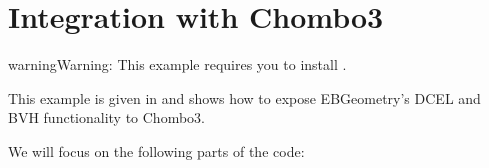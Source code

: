 \documentclass[letterpaper,10pt,english]{sphinxmanual}
\begin{document}
\sphinxstepscope


\section{Integration with Chombo3}
\label{\detokenize{Example_Chombo3:integration-with-chombo3}}\label{\detokenize{Example_Chombo3::doc}}
\begin{sphinxadmonition}{warning}{Warning:}
\sphinxAtStartPar
This example requires you to install .
\end{sphinxadmonition}

\sphinxAtStartPar
This example is given in  and shows how to expose EBGeometry’s DCEL and BVH functionality to Chombo3.

\sphinxAtStartPar
We will focus on the following parts of the code:
\end{document}
